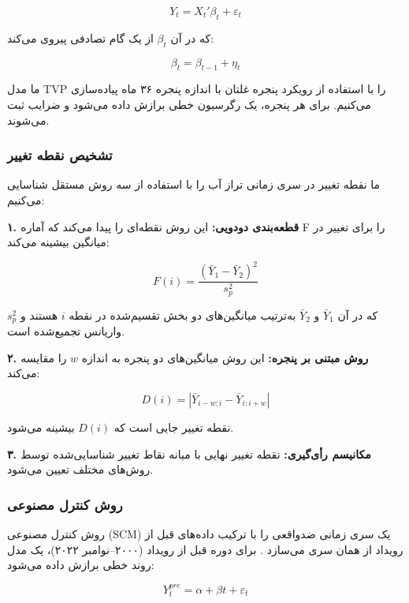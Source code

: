 \documentclass[12pt,a4paper,twocolumn]{article}
\begin{document}
\begin{equation}
Y_t = X_t' \beta_t + \varepsilon_t
\end{equation}

که در آن $\beta_t$ از یک گام تصادفی پیروی می‌کند:

\begin{equation}
\beta_t = \beta_{t-1} + \eta_t
\end{equation}

ما مدل TVP را با استفاده از رویکرد پنجره غلتان با اندازه پنجره ۳۶ ماه پیاده‌سازی می‌کنیم. برای هر پنجره، یک رگرسیون خطی برازش داده می‌شود و ضرایب ثبت می‌شوند.

\subsubsection{تشخیص نقطه تغییر}

ما نقطه تغییر در سری زمانی تراز آب را با استفاده از سه روش مستقل شناسایی می‌کنیم:

\textbf{۱. قطعه‌بندی دودویی:} این روش نقطه‌ای را پیدا می‌کند که آماره F را برای تغییر در میانگین بیشینه می‌کند:

\begin{equation}
F(i) = \frac{(\bar{Y}_1 - \bar{Y}_2)^2}{s_p^2}
\end{equation}

که در آن $\bar{Y}_1$ و $\bar{Y}_2$ به‌ترتیب میانگین‌های دو بخش تقسیم‌شده در نقطه $i$ هستند و $s_p^2$ واریانس تجمیع‌شده است.

\textbf{۲. روش مبتنی بر پنجره:} این روش میانگین‌های دو پنجره به اندازه $w$ را مقایسه می‌کند:

\begin{equation}
D(i) = |\bar{Y}_{i-w:i} - \bar{Y}_{i:i+w}|
\end{equation}

نقطه تغییر جایی است که $D(i)$ بیشینه می‌شود.

\textbf{۳. مکانیسم رأی‌گیری:} نقطه تغییر نهایی با میانه نقاط تغییر شناسایی‌شده توسط روش‌های مختلف تعیین می‌شود.

\subsubsection{روش کنترل مصنوعی}

روش کنترل مصنوعی (SCM) یک سری زمانی ضدواقعی را با ترکیب داده‌های قبل از رویداد از همان سری می‌سازد \citep{abadie2010}. برای دوره قبل از رویداد (۲۰۰۰–نوامبر ۲۰۲۲)، یک مدل روند خطی برازش داده می‌شود:

\begin{equation}
Y_t^{pre} = \alpha + \beta t + \varepsilon_t
\end{equation}
\end{document}
